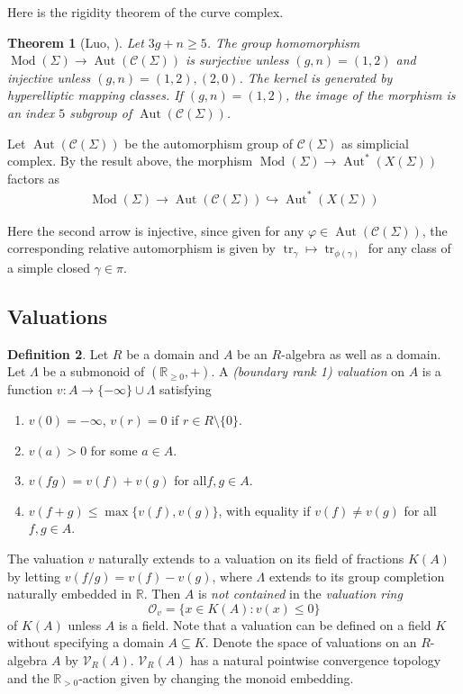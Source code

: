 \documentclass[11pt]{amsart}
\newtheorem{theorem}{Theorem}
\numberwithin{theorem}{section}
\theoremstyle{definition}
\newtheorem{definition}[theorem]{Definition}
\theoremstyle{remark}
\newcommand{\R}{{\mathbb{R}}}
\newcommand{\Ccal}{{\mathcal{C}}}
\newcommand{\Ocal}{{\mathcal{O}}}
\newcommand{\Vcal}{{\mathcal{V}}}
\DeclareMathOperator{\Aut}{Aut}
\DeclareMathOperator{\Mod}{Mod}
\DeclareMathOperator{\tr}{tr}
\newcommand{\<}{\langle}
\renewcommand{\>}{\rangle}
\begin{document}
Here is the rigidity theorem of the curve complex.

\begin{theorem}[Luo, \cite{luo1999automorphisms}]
    Let $3g + n \geq 5$. The group homomorphism $\Mod(\Sigma) \rightarrow \Aut(\Ccal(\Sigma))$ is surjective unless $(g, n) = (1, 2)$ and injective unless $(g, n) = (1, 2), (2, 0)$. The kernel is generated by hyperelliptic mapping classes. If $(g, n) = (1, 2)$, the image of the morphism is an index $5$ subgroup of $\Aut(\Ccal(\Sigma))$.
\end{theorem}

Let $\Aut(\Ccal(\Sigma))$ be the automorphism group of $\Ccal(\Sigma)$ as simplicial complex. By the result above, the morphism $\Mod(\Sigma) \rightarrow \Aut^*(X(\Sigma))$ factors as
\begin{align}\label{mod to aut}
    \Mod(\Sigma) \rightarrow \Aut(\Ccal(\Sigma)) \hookrightarrow \Aut^*(X(\Sigma))
\end{align}

Here the second arrow is injective, since given for any $\varphi \in \Aut(\Ccal(\Sigma))$, the corresponding relative automorphism is given by $\tr_\gamma \mapsto \tr_{\phi(\gamma)}$ for any class of a simple closed $\gamma \in \pi$.

\subsection{Valuations}\label{section2.2}

\begin{definition}\label{valdef}
    Let $R$ be a domain and $A$ be an $R$-algebra as well as a domain. Let $\Lambda$ be a submonoid of $(\R_{\geq 0}, +)$. A \textit{(boundary rank 1) valuation} on $A$ is a function $v : A \rightarrow \{ -\infty \} \cup \Lambda $ satisfying
    \begin{enumerate}
        \item $v(0) = -\infty$, $v(r) = 0$ if $r \in R \setminus \{ 0 \}$.
        \item $v(a) > 0$ for some $a \in A$.
        \item $v(fg) = v(f) + v(g)$ for all$ f, g \in A$.
        \item $v(f + g) \leq \max \{ v(f), v(g) \}$, with equality if $v(f) \neq v(g)$ for all $f, g \in A$.
    \end{enumerate}
\end{definition}

The valuation $v$ naturally extends to a valuation on its field of fractions $K(A)$ by letting $v(f/g) = v(f) - v(g)$, where $\Lambda$ extends to its group completion naturally embedded in $\R$. Then $A$ is \textit{not contained} in the \textit{valuation ring}
\[
\Ocal_v = \{ x \in K(A) : v(x) \leq 0 \}
\]
of $K(A)$ unless $A$ is a field. Note that a valuation can be defined on a field $K$ without specifying a domain $A \subseteq K$. Denote the space of valuations on an $R$-algebra $A$ by $\Vcal_R(A)$. $\Vcal_R(A)$ has a natural pointwise convergence topology and the $\R_{>0}$-action given by changing the monoid embedding. 
\end{document}
